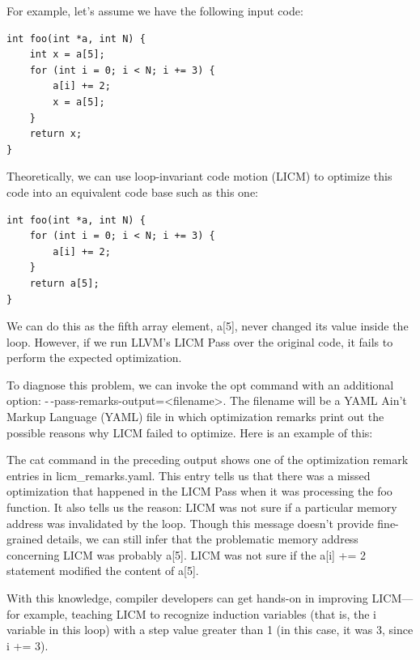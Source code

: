 For example, let's assume we have the following input code:

\begin{lstlisting}[style=styleCXX]
int foo(int *a, int N) {
	int x = a[5];
	for (int i = 0; i < N; i += 3) {
		a[i] += 2;
		x = a[5];
	}
	return x;
}
\end{lstlisting}

Theoretically, we can use loop-invariant code motion (LICM) to optimize this code into an equivalent code base such as this one:

\begin{lstlisting}[style=styleCXX]
int foo(int *a, int N) {
	for (int i = 0; i < N; i += 3) {
		a[i] += 2;
	}
	return a[5];
}
\end{lstlisting}

We can do this as the fifth array element, a[5], never changed its value inside the loop. However, if we run LLVM's LICM Pass over the original code, it fails to perform the expected optimization.

To diagnose this problem, we can invoke the opt command with an additional option: -\,-pass-remarks-output=<filename>. The filename will be a YAML Ain't Markup Language (YAML) file in which optimization remarks print out the possible reasons why LICM failed to optimize. Here is an example of this:


The cat command in the preceding output shows one of the optimization remark entries in licm\_remarks.yaml. This entry tells us that there was a missed optimization that happened in the LICM Pass when it was processing the foo function. It also tells us the reason: LICM was not sure if a particular memory address was invalidated by the loop. Though this message doesn't provide fine-grained details, we can still infer that the problematic memory address concerning LICM was probably a[5]. LICM was not sure if the a[i] += 2 statement modified the content of a[5].

With this knowledge, compiler developers can get hands-on in improving LICM—for example, teaching LICM to recognize induction variables (that is, the i variable in this loop) with a step value greater than 1 (in this case, it was 3, since i += 3).

